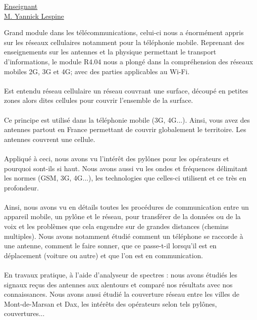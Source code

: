 \renewcommand{\figurename}{}

\vspace*{0.2cm}%
      \large
      \href{}{\color{black}Enseignant\\M. Yannick Lespine   }\\%
      \normalsize
\vspace*{0.5cm}%

Grand module dans les télécommunications, celui-ci nous a énormément appris sur les réseaux cellulaires notamment pour la téléphonie mobile. Reprenant des enseignements sur les antennes et la physique permettant le transport d'informations, le module R4.04 nous a plongé dans la compréhension des réseaux mobiles 2G, 3G et 4G; avec des parties applicables au Wi-Fi.
\\ \\
Est entendu réseau cellulaire un réseau couvrant une surface, découpé en petites zones alors dites cellules pour couvrir l'ensemble de la surface.
\\ \\
Ce principe est utilisé dans la téléphonie mobile (3G, 4G...). Ainsi, vous avez des antennes partout en France permettant de couvrir globalement le territoire. Les antennes couvrent une cellule.
\\\\
Appliqué à ceci, nous avons vu l'intérêt des pylônes pour les opérateurs et pourquoi sont-ils si haut. Nous avons aussi vu les ondes et fréquences délimitant les normes (GSM, 3G, 4G...), les technologies que celles-ci utilisent et ce très en profondeur.
\\ \\
Ainsi, nous avons vu en détails toutes les procédures de communication entre un appareil mobile, un pylône et le réseau, pour transférer de la données ou de la voix et les problèmes que cela engendre sur de grandes distances (chemins multiples). Nous avons notamment étudié comment un téléphone se raccorde à une antenne, comment le faire sonner, que ce passe-t-il lorsqu'il est en déplacement (voiture ou autre) et que l'on est en communication.
\\ \\
En travaux pratique, à l'aide d'analyseur de spectres : nous avons étudiés les signaux reçus des antennes aux alentours et comparé nos résultats avec nos connaissances. Nous avons aussi étudié la couverture réseau entre les villes de Mont-de-Marsan et Dax, les intérêts des opérateurs selon tels pylônes, couvertures...